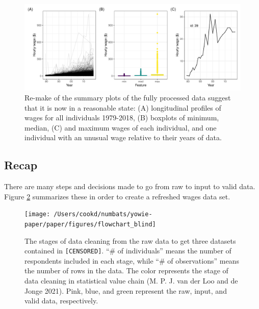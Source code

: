 \documentclass{article}
\begin{document}
\begin{figure}

{\centering \includegraphics[width=1\linewidth]{figures/fixed-feature-plot-1} 

}

\caption{Re-make of the summary plots of the fully processed data suggest that it is now in a reasonable state: (A) longitudinal profiles of wages for all individuals 1979-2018, (B) boxplots of minimum, median, (C) and maximum wages of each individual, and one individual with an unusual wage relative to their years of data. }\label{fig:fixed-feature-plot}
\end{figure}

\hypertarget{recap}{%
\subsection{Recap}\label{recap}}

There are many steps and decisions made to go from raw to input to valid data. Figure \ref{fig:flow-chart-blind} summarizes these in order to create a refreshed wages data set.



\begin{figure}

{\centering \texttt{[image: /Users/cookd/numbats/yowie-paper/paper/figures/flowchart\_blind]} 

}

\caption{The stages of data cleaning from the raw data to get three datasets contained in \texttt{[CENSORED]}. ``\# of individuals'' means the number of respondents included in each stage, while ``\# of observations'' means the number of rows in the data. The color represents the stage of data cleaning in statistical value chain (M. P. J. van der Loo and de Jonge 2021). Pink, blue, and green represent the raw, input, and valid data, respectively.}\label{fig:flow-chart-blind}
\end{figure}
\end{document}
